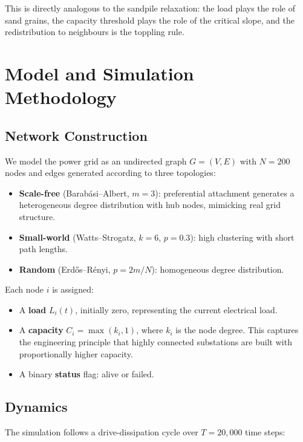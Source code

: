 \documentclass[12pt,a4paper]{article}
\begin{document}
This is directly analogous to the sandpile relaxation: the load plays the role of sand grains, the capacity threshold plays the role of the critical slope, and the redistribution to neighbours is the toppling rule.


\section{Model and Simulation Methodology}
\label{sec:model}

\subsection{Network Construction}

We model the power grid as an undirected graph $G = (V, E)$ with $N = 200$ nodes and edges generated according to three topologies:

\begin{itemize}[leftmargin=2em]
  \item \textbf{Scale-free} (Barab\'asi--Albert, $m=3$): preferential attachment generates a heterogeneous degree distribution with hub nodes, mimicking real grid structure.
  \item \textbf{Small-world} (Watts--Strogatz, $k=6$, $p=0.3$): high clustering with short path lengths.
  \item \textbf{Random} (Erd\H{o}s--R\'enyi, $p = 2m/N$): homogeneous degree distribution.
\end{itemize}

Each node $i$ is assigned:
\begin{itemize}[leftmargin=2em]
  \item A \textbf{load} $L_i(t)$, initially zero, representing the current electrical load.
  \item A \textbf{capacity} $C_i = \max(k_i, 1)$, where $k_i$ is the node degree. This captures the engineering principle that highly connected substations are built with proportionally higher capacity.
  \item A binary \textbf{status} flag: alive or failed.
\end{itemize}

\subsection{Dynamics}

The simulation follows a drive-dissipation cycle over $T = 20{,}000$ time steps:
\end{document}

